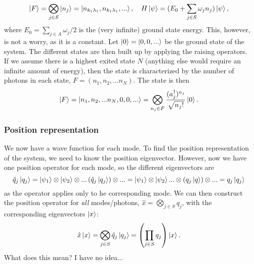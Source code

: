 \begin{equation*}
    \ket F = \bigotimes_{j \in S} \ket{n_j} = \ket{n_{k_1\lambda_1}, n_{k_1\lambda_1}, ...},  \quad H \ket \psi = (E_0 + \sum_{j \in S}\omega_{j} n_{j}) \ket \psi,
\end{equation*}
where $E_0 = \sum_{j\in A} \omega_j / 2$ is the (very infinite) ground state energy. This, however, is not a worry, as it is a constant. Let $\ket 0 = \ket{0, 0, ...}$ be the ground state of the system. The different states are then built up by applying the raising operators. If we assume there is a highest exited state $N$ (anything else would require an infinite amount of energy), then the state is characterized by the number of photons in each state, $F = (n_1, n_2, ... n_N)$. The state is then
\begin{equation*}
    \ket F = \ket{n_1, n_2, ... n_N, 0, 0, ...} = \bigotimes_{n_j \in F} \frac{(a_j^\dagger)^{n_j}}{\sqrt{n_j!}} \ket 0.
\end{equation*}

\subsubsection*{Position representation}
We now have a wave function for each mode.  To find the position representation of the system, we need to know the position eigenvector. However, now we have one position operator for each mode, so the different eigenvectors are
\begin{equation*}
    \hat q_j \ket{q_j} = \ket{\psi_1} \otimes \ket{\psi_2} \otimes ... \left( \hat q_j \ket{q_j} \right) \otimes ... = \ket{\psi_1} \otimes \ket{\psi_2} ... \otimes \left(q_j \ket q  \right) \otimes ... = q_j \ket{q_j}
\end{equation*}
as the operator applies only to he corresponding mode. We can then construct the position operator for \emph{all} modes/photons, $\hat x = \bigotimes_{j\in S} q_j$, with the corresponding eigenvectors $\ket x$:
\begin{equation*}
    \hat x \ket x = \bigotimes_{j\in S} \hat q_j \ket{q_j} = \left(\prod_{j\in S} q_j\right) \ket x.
\end{equation*}
What does this mean? I have no idea...

